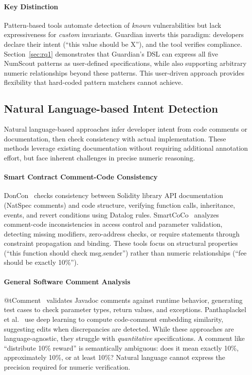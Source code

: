 \documentclass[pdflatex,sn-basic]{sn-jnl}%
\theoremstyle{thmstyleone}%
\theoremstyle{thmstyletwo}%
\theoremstyle{thmstylethree}%
\begin{document}
\paragraph{Key Distinction}
Pattern-based tools automate detection of \textit{known} vulnerabilities but lack expressiveness for \textit{custom} invariants. Guardian inverts this paradigm: developers declare their intent (``this value should be X''), and the tool verifies compliance. Section~\ref{sec:rq1} demonstrates that Guardian's DSL can express all five NumScout patterns as user-defined specifications, while also supporting arbitrary numeric relationships beyond these patterns. This user-driven approach provides flexibility that hard-coded pattern matchers cannot achieve.


\subsection{Natural Language-based Intent Detection}

Natural language-based approaches infer developer intent from code comments or documentation, then check consistency with actual implementation. These methods leverage existing documentation without requiring additional annotation effort, but face inherent challenges in precise numeric reasoning.

\paragraph{Smart Contract Comment-Code Consistency}
DonCon~\citep{solapi} checks consistency between Solidity library API documentation (NatSpec comments) and code structure, verifying function calls, inheritance, events, and revert conditions using Datalog rules. SmartCoCo~\citep{coco} analyzes comment-code inconsistencies in access control and parameter validation, detecting missing modifiers, zero-address checks, or require statements through constraint propagation and binding. These tools focus on structural properties (``this function should check msg.sender'') rather than numeric relationships (``fee should be exactly 10\%'').

\paragraph{General Software Comment Analysis}
@tComment~\citep{tcomment} validates Javadoc comments against runtime behavior, generating test cases to check parameter types, return values, and exceptions. Panthaplackel et al.~\citep{deep} use deep learning to compute code-comment embedding similarity, suggesting edits when discrepancies are detected. While these approaches are language-agnostic, they struggle with \textit{quantitative} specifications. A comment like ``distribute 10\% reward'' is semantically ambiguous: does it mean exactly 10\%, approximately 10\%, or at least 10\%? Natural language cannot express the precision required for numeric verification.
\end{document}
